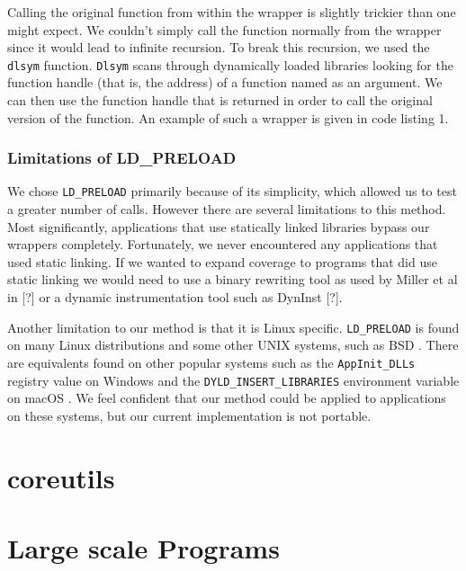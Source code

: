 \documentclass[10pt]{article}
\begin{document}
Calling the original function from within the wrapper is slightly trickier than one might expect. We couldn't simply call the function normally from the wrapper since it would lead to infinite recursion. To break this recursion, we used the \texttt{dlsym} function. \texttt{Dlsym} scans through dynamically loaded libraries looking for the function handle (that is, the address) of a function named as an argument. We can then use the function handle that is returned in order to call the original version of the function. An example of such a wrapper is given in code listing 1.

\begin{minipage}{\linewidth} %
	
\end{minipage}

\subsubsection{Limitations of LD\_PRELOAD}
We chose \texttt{LD\_PRELOAD} primarily because of its simplicity, which allowed us to test a greater number of calls. However there are several limitations to this method. Most significantly, applications that use statically linked libraries bypass our wrappers completely. Fortunately, we never encountered any applications that used static linking. If we wanted to expand coverage to programs that did use static linking we would need to use a binary rewriting tool as used by Miller et al in [?] or a dynamic instrumentation tool such as DynInst [?].

Another limitation to our method is that it is Linux specific. \texttt{LD\_PRELOAD} is found on many Linux distributions and some other UNIX systems, such as BSD \cite{bsd}. There are equivalents found on other popular systems such as the \texttt{AppInit\_DLLs} registry value on Windows \cite{dll} and the \texttt{DYLD\_INSERT\_LIBRARIES} environment variable on macOS \cite{macos}. We feel confident that our method could be applied to applications on these systems, but our current implementation is not portable.



\section{coreutils}

\section{Large scale Programs}
\end{document}
